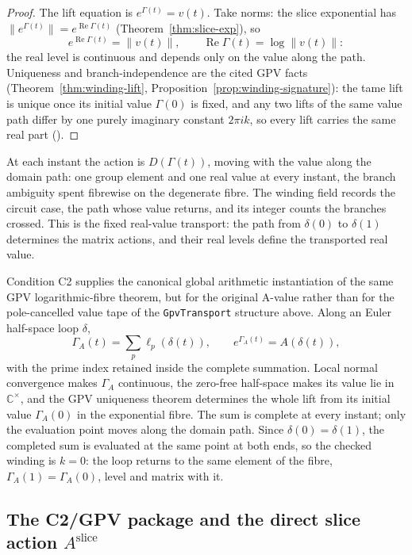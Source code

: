\documentclass[11pt]{article}
\newcommand{\CC}{\mathbb{C}}
\theoremstyle{plain}
\theoremstyle{definition}
\theoremstyle{remark}
\begin{document}
\begin{proof}
The lift equation is $e^{\Gamma(t)}=v(t)$. Take norms: the slice exponential
has $\lVert e^{\Gamma(t)}\rVert=e^{\operatorname{Re}\Gamma(t)}$
(Theorem~\ref{thm:slice-exp}), so
\[
  e^{\operatorname{Re}\Gamma(t)}=\lVert v(t)\rVert,
  \qquad
  \operatorname{Re}\Gamma(t)=\log\lVert v(t)\rVert:
\]
the real level is continuous and depends only on the value along the path.
Uniqueness and branch-independence are the cited GPV facts
(Theorem~\ref{thm:winding-lift}, Proposition~\ref{prop:winding-signature}):
the tame lift is unique once its initial value $\Gamma(0)$ is fixed, and any
two lifts of the same value path differ by one purely imaginary constant
$2\pi ik$, so every lift carries the same real part
\textup{(}\cite[Cor.~4.13]{GPVwind}\textup{)}.
\end{proof}

At each instant the
action is $D(\Gamma(t))$, moving with the value along the domain path: one
group element and one real value at every instant, the branch ambiguity
spent fibrewise on the degenerate fibre. The winding field records the
circuit case, the path whose value returns, and its integer counts the
branches crossed. This is the fixed real-value transport: the path from
$\delta(0)$ to $\delta(1)$ determines the matrix actions, and their real
levels define the transported real value.

Condition \textup{C2} supplies the canonical global arithmetic instantiation
of the same GPV logarithmic-fibre theorem, but for the original A-value rather
than for the pole-cancelled value tape of the \texttt{GpvTransport} structure
above. Along an Euler half-space loop $\delta$,
\[
  \Gamma_A(t)=\sum_{p}\ell_p(\delta(t)),
  \qquad e^{\Gamma_A(t)}=A(\delta(t)),
\]
with the prime index retained inside the complete summation. Local normal convergence makes
$\Gamma_A$ continuous, the zero-free half-space makes its value lie in $\CC^\times$, and the
GPV uniqueness theorem determines the whole lift from its initial value
$\Gamma_A(0)$ in the exponential fibre. The sum is
complete at every instant; only the evaluation point moves along the domain path. Since $\delta(0)=
\delta(1)$, the completed sum is evaluated at the same point at both ends, so the checked
winding is $k=0$: the loop returns to the same element of the fibre, $\Gamma_A(1)=\Gamma_A(0)$, level and
matrix with it.

\subsection*{The C2/GPV package and the direct slice action $A^{\mathrm{slice}}$}
\end{document}
